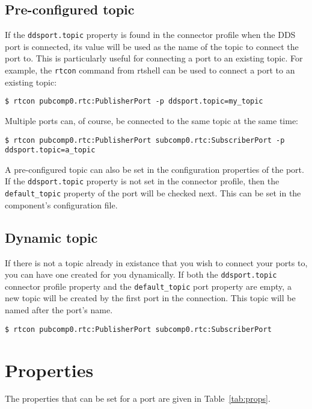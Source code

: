 \documentclass[a4paper,10pt]{article}
\newcommand{\ilcode}[1]{\lstinline|#1|}
\begin{document}
\subsection{Pre-configured topic}

If the \ilcode{ddsport.topic} property is found in the connector profile
when the DDS port is connected, its value will be used as the name of
the topic to connect the port to. This is particularly useful for
connecting a port to an existing topic. For example, the \ilcode{rtcon}
command from rtshell can be used to connect a port to an existing topic:

\ilcode{$ rtcon pubcomp0.rtc:PublisherPort -p ddsport.topic=my_topic}

Multiple ports can, of course, be connected to the same topic at the
same time:

\ilcode{$ rtcon pubcomp0.rtc:PublisherPort subcomp0.rtc:SubscriberPort -p ddsport.topic=a_topic}

A pre-configured topic can also be set in the configuration properties
of the port. If the \ilcode{ddsport.topic} property is not set in the
connector profile, then the \ilcode{default_topic} property of the port
will be checked next. This can be set in the component's configuration
file.

\subsection{Dynamic topic}

If there is not a topic already in existance that you wish to connect
your ports to, you can have one created for you dynamically. If
both the \ilcode{ddsport.topic} connector profile property and the
\ilcode{default_topic} port property are empty, a new topic will be
created by the first port in the connection. This topic will be named
after the port's name.

\ilcode{$ rtcon pubcomp0.rtc:PublisherPort subcomp0.rtc:SubscriberPort}

\section{Properties}
\label{sec:props}

The properties that can be set for a port are given in
Table~\ref{tab:props}.
\end{document}
